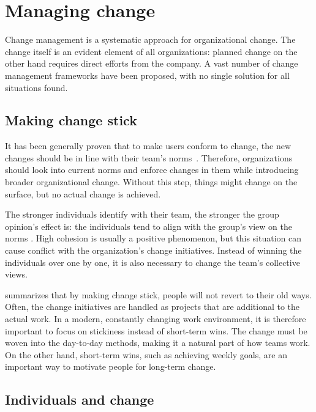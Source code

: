 \section{Managing change}

Change management is a systematic approach for organizational change. The change itself is an evident element of all organizations: planned change on the other hand requires direct efforts from the company. A vast number of change management frameworks have been proposed, with no single solution for all situations found.~\cite{todnem_organisational_2005}

\subsection{Making change stick}

It has been generally proven that to make users conform to change, the new changes should be in line with their team's norms~\cite{terry_attitude-behaviour_2000}. Therefore, organizations should look into current norms and enforce changes in them while introducing broader organizational change. Without this step, things might change on the surface, but no actual change is achieved. 

The stronger individuals identify with their team, the stronger the group opinion's effect is: the individuals tend to align with the group's view on the norms \cite{terry_attitude-behaviour_2000}. High cohesion is usually a positive phenomenon, but this situation can cause conflict with the organization's change initiatives. Instead of winning the individuals over one by one, it is also necessary to change the team's collective views.

\citet{kotter_leading_1995} summarizes that by making change stick, people will not revert to their old ways. Often, the change initiatives are handled as projects that are additional to the actual work. In a modern, constantly changing work environment, it is therefore important to focus on stickiness instead of short-term wins. The change must be woven into the day-to-day methods, making it a natural part of how teams work. On the other hand, short-term wins, such as achieving weekly goals, are an important way to motivate people for long-term change.~\cite{kotter_leading_1995}

\subsection{Individuals and change}

